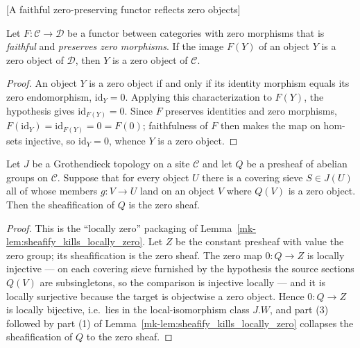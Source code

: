 \begin{lemma}

[A faithful zero-preserving functor reflects zero objects]
  \label{mk-lem:isZero_of_faithful_preservesZeroMorphisms}

  Let \(F : \mathcal{C} \to \mathcal{D}\) be a functor between categories with zero
  morphisms that is \emph{faithful} and \emph{preserves zero morphisms}. If the image
  \(F(Y)\) of an object \(Y\) is a zero object of \(\mathcal{D}\), then \(Y\) is a zero
  object of \(\mathcal{C}\).
\end{lemma}
\begin{proof}

  An object \(Y\) is a zero object if and only if its identity morphism equals its zero
  endomorphism, \(\mathrm{id}_Y = 0\). Applying this characterization to \(F(Y)\), the
  hypothesis gives \(\mathrm{id}_{F(Y)} = 0\). Since \(F\) preserves identities and zero
  morphisms, \(F(\mathrm{id}_Y) = \mathrm{id}_{F(Y)} = 0 = F(0)\); faithfulness of \(F\)
  then makes the map on hom-sets injective, so \(\mathrm{id}_Y = 0\), whence \(Y\) is a
  zero object.
\end{proof}

\begin{lemma}\label{mk-lem:isZero_presheafToSheaf_of_locally_isZero}
  \leanok

  Let \(J\) be a Grothendieck topology on a site \(\mathcal{C}\) and let \(Q\) be a
  presheaf of abelian groups on \(\mathcal{C}\). Suppose that for every object \(U\) there
  is a covering sieve \(S \in J(U)\) all of whose members \(g : V \to U\) land on an object
  \(V\) where \(Q(V)\) is a zero object. Then the sheafification of \(Q\) is the zero
  sheaf.
\end{lemma}
\begin{proof}
  \leanok
  This is the ``locally zero'' packaging of
  Lemma~\ref{mk-lem:sheafify_kills_locally_zero}. Let \(Z\) be the constant presheaf with
  value the zero group; its sheafification is the zero sheaf. The zero map \(0 : Q \to Z\)
  is locally injective --- on each covering sieve furnished by the hypothesis the source
  sections \(Q(V)\) are subsingletons, so the comparison is injective locally --- and it
  is locally surjective because the target is objectwise a zero object. Hence
  \(0 : Q \to Z\) is locally bijective, i.e.\ lies in the local-isomorphism class
  \(J.W\), and part (3) followed by part (1) of
  Lemma~\ref{mk-lem:sheafify_kills_locally_zero} collapses the sheafification of \(Q\) to the
  zero sheaf.
\end{proof}


